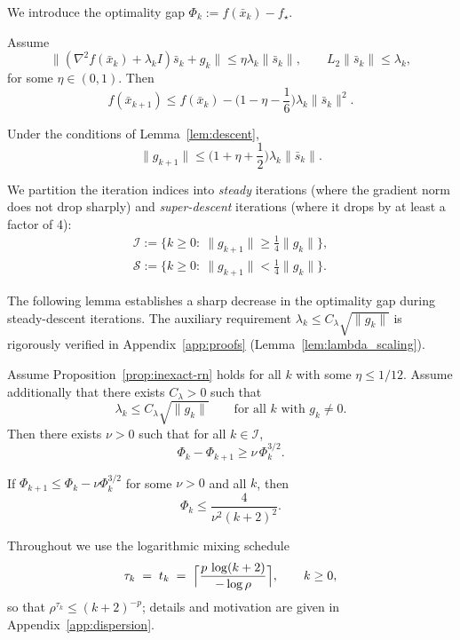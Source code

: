 \documentclass[review,onefignum,onetabnum]{siamart171218}
\begin{document}
	We introduce the optimality gap $\Phi_k:=f(\bar x_k)-f_\star$.
	
	\begin{lemma}\label{lem:descent}
		Assume
		\[
		\|(\nabla^2 f(\bar x_k)+\lambda_k I)\bar s_k+g_k\|\le \eta\lambda_k\|\bar s_k\|,
		\qquad
		L_2\|\bar s_k\|\le \lambda_k,
		\]
		for some $\eta\in(0,1)$.
		Then
		\[
		f(\bar x_{k+1})\le f(\bar x_k) - \Big(1-\eta-\frac{1}{6}\Big)\lambda_k\|\bar s_k\|^2.
		\]
	\end{lemma}
	
	\begin{lemma}\label{lem:grad_bound}
		Under the conditions of Lemma~\ref{lem:descent},
		\[
		\|g_{k+1}\|\le \Big(1+\eta+\frac{1}{2}\Big)\lambda_k\|\bar s_k\|.
		\]
	\end{lemma}
	
	We partition the iteration indices into \emph{steady} iterations
	(where the gradient norm does not drop sharply) and
	\emph{super-descent} iterations (where it drops by at least a factor of 4):
	\begin{gather*}
		\mathcal I:=\{k\ge0:\ \|g_{k+1}\|\ge \tfrac14\|g_k\|\},\\
		\mathcal S:=\{k\ge0:\ \|g_{k+1}\|< \tfrac14\|g_k\|\}.
	\end{gather*}
	
	The following lemma establishes a sharp decrease in the optimality gap
	during steady-descent iterations.
	The auxiliary requirement $\lambda_k\le C_\lambda\sqrt{\|g_k\|}$ is
	rigorously verified in Appendix~\ref{app:proofs}
	(Lemma~\ref{lem:lambda_scaling}).
	
	\begin{lemma}\label{lem:steady}
		Assume Proposition~\ref{prop:inexact-rn} holds for all $k$ with some $\eta\le 1/12$.
		Assume additionally that there exists $C_\lambda>0$ such that
		\[
		\lambda_k\le C_\lambda\sqrt{\|g_k\|}\qquad\text{for all $k$ with $g_k\neq 0$}.
		\]
		Then there exists $\nu>0$ such that for all $k\in\mathcal I$,
		\[
		\Phi_k-\Phi_{k+1}\ge \nu\,\Phi_k^{3/2}.
		\]
	\end{lemma}
	
	\begin{lemma}\label{lem:solve32}
		If $\Phi_{k+1}\le \Phi_k-\nu\Phi_k^{3/2}$ for some $\nu>0$ and all $k$, then
		\[
		\Phi_k\le \frac{4}{\nu^2(k+2)^2}.
		\]
	\end{lemma}
	
	Throughout we use the logarithmic mixing schedule
	\begin{equation}\label{eq:log_schedule_main}
		\tau_k \;=\; t_k \;=\; \Bigl\lceil \frac{p\,\log(k+2)}{-\log\rho} \Bigr\rceil,
		\qquad k\ge 0,
	\end{equation}
	so that $\rho^{\tau_k}\le(k+2)^{-p}$; details and motivation are given in
	Appendix~\ref{app:dispersion}.
	
\end{document}

